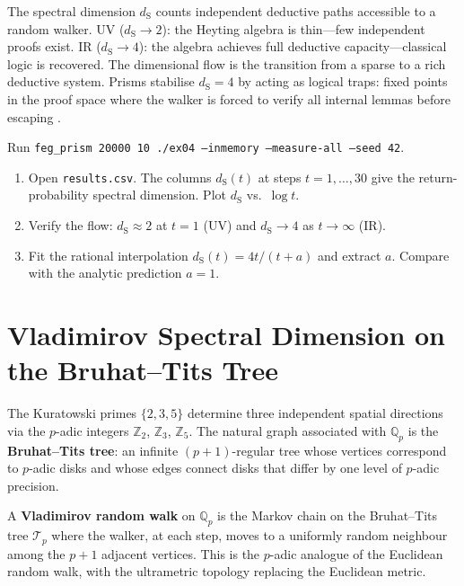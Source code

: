 \documentclass[11pt, a4paper, openany]{book}
\newcommand{\dS}{d_{\mathrm{S}}}
\begin{document}
\begin{logicalreading}
The spectral dimension $\dS$ counts independent deductive paths
accessible to a random walker. UV ($\dS \to 2$): the Heyting algebra is
thin---few independent proofs exist. IR ($\dS \to 4$): the algebra
achieves full deductive capacity---classical logic is recovered. The
dimensional flow is the transition from a sparse to a rich deductive
system. Prisms stabilise $\dS = 4$ by acting as logical traps:
fixed points in the proof space where the walker is forced to verify
all internal lemmas before escaping \cite{stone1936}.
\end{logicalreading}


\begin{simulation}
Run \texttt{feg\_prism 20000 10 ./ex04 --inmemory --measure-all --seed 42}.
\begin{enumerate}
\item Open \texttt{results.csv}. The columns $\dS(t)$ at steps $t = 1, \ldots, 30$ give the return-probability spectral dimension. Plot $\dS$ vs.\ $\log t$.
\item Verify the flow: $\dS \approx 2$ at $t = 1$ (UV) and $\dS \to 4$ as $t \to \infty$ (IR).
\item Fit the rational interpolation $\dS(t) = 4t/(t + a)$ and extract $a$. Compare with the analytic prediction $a = 1$.
\end{enumerate}
\end{simulation}


\section{Vladimirov Spectral Dimension on the Bruhat--Tits Tree}
\label{sec:vladimirov-ds}

The Kuratowski primes $\{2, 3, 5\}$ determine three independent
spatial directions via the $p$-adic integers $\mathbb{Z}_2$,
$\mathbb{Z}_3$, $\mathbb{Z}_5$. The natural graph associated with
$\mathbb{Q}_p$ is the \textbf{Bruhat--Tits tree}: an infinite
$(p+1)$-regular tree whose vertices correspond to $p$-adic disks
and whose edges connect disks that differ by one level of
$p$-adic precision.

\begin{definition}\label{def:vladimirov-walk}
A \textbf{Vladimirov random walk} on $\mathbb{Q}_p$ is the
Markov chain on the Bruhat--Tits tree $\mathcal{T}_p$ where the
walker, at each step, moves to a uniformly random neighbour among
the $p + 1$ adjacent vertices. This is the $p$-adic analogue of
the Euclidean random walk, with the ultrametric topology
replacing the Euclidean metric.
\end{definition}
\end{document}
